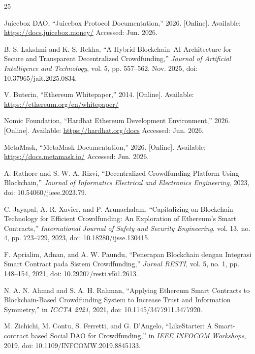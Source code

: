 \documentclass[conference]{IEEEtran}
\begin{document}
\begin{thebibliography}{25}

Juicebox DAO, ``Juicebox Protocol Documentation,'' 2026. [Online]. Available: \url{https://docs.juicebox.money/} Accessed: Jun. 2026.

B. S. Lakshmi and K. S. Rekha, ``A Hybrid Blockchain--AI Architecture for Secure and Transparent Decentralized Crowdfunding,'' \textit{Journal of Artificial Intelligence and Technology}, vol. 5, pp. 557--562, Nov. 2025, doi: 10.37965/jait.2025.0834.

V. Buterin, ``Ethereum Whitepaper,'' 2014. [Online]. Available: \url{https://ethereum.org/en/whitepaper/}

Nomic Foundation, ``Hardhat Ethereum Development Environment,'' 2026. [Online]. Available: \url{https://hardhat.org/docs} Accessed: Jun. 2026.

MetaMask, ``MetaMask Documentation,'' 2026. [Online]. Available: \url{https://docs.metamask.io/} Accessed: Jun. 2026.

A. Rathore and S. W. A. Rizvi, ``Decentralized Crowdfunding Platform Using Blockchain,'' \textit{Journal of Informatics Electrical and Electronics Engineering}, 2023, doi: 10.54060/jieee.2023.79.

C. Jayapal, A. R. Xavier, and P. Arunachalam, ``Capitalizing on Blockchain Technology for Efficient Crowdfunding: An Exploration of Ethereum's Smart Contracts,'' \textit{International Journal of Safety and Security Engineering}, vol. 13, no. 4, pp. 723--729, 2023, doi: 10.18280/ijsse.130415.

F. Aprialim, Adnan, and A. W. Paundu, ``Penerapan Blockchain dengan Integrasi Smart Contract pada Sistem Crowdfunding,'' \textit{Jurnal RESTI}, vol. 5, no. 1, pp. 148--154, 2021, doi: 10.29207/resti.v5i1.2613.

N. A. N. Ahmad and S. A. H. Rahman, ``Applying Ethereum Smart Contracts to Blockchain-Based Crowdfunding System to Increase Trust and Information Symmetry,'' in \textit{ICCTA 2021}, 2021, doi: 10.1145/3477911.3477920.

M. Zichichi, M. Contu, S. Ferretti, and G. D'Angelo, ``LikeStarter: A Smart-contract based Social DAO for Crowdfunding,'' in \textit{IEEE INFOCOM Workshops}, 2019, doi: 10.1109/INFCOMW.2019.8845133.


\end{thebibliography}
\end{document}
